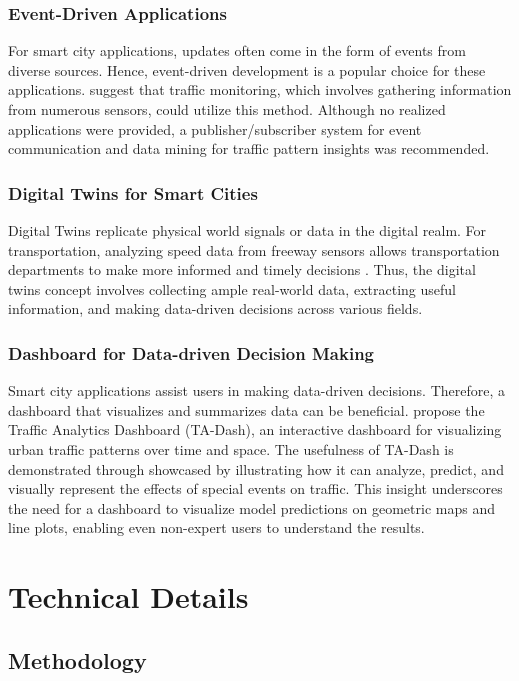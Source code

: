 \documentclass{report}
\begin{document}
\subsection{Event-Driven Applications}
 For smart city applications, updates often come in the form of events from diverse sources. Hence, event-driven development is a popular choice for these applications. \citet{hinze2009event} suggest that traffic monitoring, which involves gathering information from numerous sensors, could utilize this method. Although no realized applications were provided, a publisher/subscriber system for event communication and data mining for traffic pattern insights was recommended.

\subsection{Digital Twins for Smart Cities}
 Digital Twins replicate physical world signals or data in the digital realm. For transportation, analyzing speed data from freeway sensors allows transportation departments to make more informed and timely decisions \autocite{hu2021digital}. Thus, the digital twins concept involves collecting ample real-world data, extracting useful information, and making data-driven decisions across various fields.

\subsection{Dashboard for Data-driven Decision Making}
 Smart city applications assist users in making data-driven decisions. Therefore, a dashboard that visualizes and summarizes data can be beneficial. \citet{tempelmeier2020ta} propose the Traffic Analytics Dashboard (TA-Dash), an interactive dashboard for visualizing urban traffic patterns over time and space. The usefulness of TA-Dash is demonstrated through showcased by illustrating how it can analyze, predict, and visually represent the effects of special events on traffic. This insight underscores the need for a dashboard to visualize model predictions on geometric maps and line plots, enabling even non-expert users to understand the results.

\chapter{Technical Details}

\section{Methodology}
\end{document}
